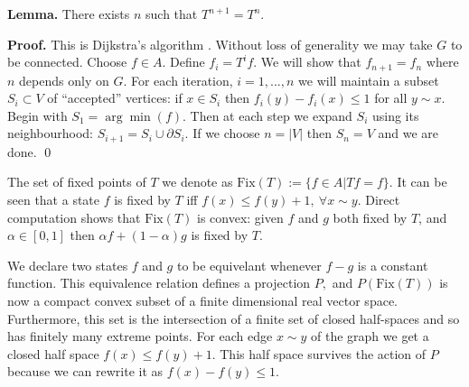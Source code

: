 \documentclass[11pt]{article}
\begin{document}
{\bf Lemma.} There exists $n$ such that $T^{n+1} = T^n.$

{\bf Proof.}
This is Dijkstra's algorithm \cite{Dijkstra1959}.
Without loss of generality we may take
$G$ to be connected.
Choose $f\in A.$
Define $f_i = T^i f.$
We will show that $f_{n+1} = f_n$
where $n$ depends only on $G.$
For each iteration, $i=1,...,n$
we will maintain a subset $S_i\subset V$
of ``accepted'' vertices:
if $x\in S_i$ then $f_i(y)-f_i(x)\le 1$ for all $y\sim x.$
Begin with $S_1=\arg\min(f).$
Then at each step we expand $S_i$ using its
neighbourhood: $S_{i+1}=S_i\cup \partial S_i.$
If we choose $n=|V|$ then $S_n=V$ and we are done.
\qed


\def\Fix{\mathrm{Fix}}

The set of fixed points of $T$ we denote as
$\Fix(T):=\{f\in A|Tf=f\}.$
It can be seen that
a state $f$ is fixed by $T$ iff
$f(x)\le f(y)+1,\ \forall x\sim y.$
Direct computation shows that
$\Fix(T)$ is convex:
given $f$ and $g$ both fixed by $T$,
and $\alpha\in[0, 1]$ then $\alpha f + (1-\alpha) g$
is fixed by $T$.

We declare two states $f$ and $g$
to be equivelant whenever $f-g$ is a constant function.
This equivalence relation defines a projection $P,$
and $P(\Fix(T))$ is now a compact convex subset of
a finite dimensional real vector space.
Furthermore, this set is the intersection
of a finite set of closed half-spaces and
so has finitely many extreme points.
For each edge $x\sim y$ of the graph
we get a closed half space
$f(x)\le f(y)+1.$
This half space survives the action of $P$
because we can rewrite it as $f(x)-f(y)\le 1.$
\end{document}
